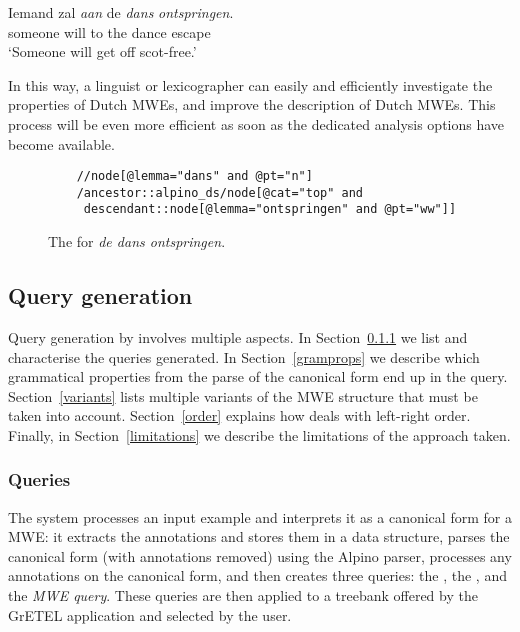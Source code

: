 \documentclass[output=paper,colorlinks,citecolor=brown]{langscibook}
\begin{document}
\begin{exe}
    \ex \gll Iemand zal \textit{aan} de \textit{dans} \textit{ontspringen}.\\
    someone will to the dance escape\\
    \glt `Someone will get off scot-free.'  \label{aandedansontspringen}
\end{exe}

In this way, a linguist or lexicographer can easily and efficiently investigate the properties of Dutch MWEs, and improve the description of Dutch MWEs. This process will be even more efficient as soon as the dedicated analysis options have become available.


\begin{figure}
\begin{verbatim}
    //node[@lemma="dans" and @pt="n"]
    /ancestor::alpino_ds/node[@cat="top" and 
     descendant::node[@lemma="ontspringen" and @pt="ww"]]
\end{verbatim}
    \caption{The {\supersetquery}  for \textit{de dans ontspringen}.} \label{dansontspringenmajorlemmaquery}
\end{figure}

\subsection{Query generation}
\label{querygeneration}

Query generation by {\mwefinder} involves multiple aspects. In Section~\ref{queries} we list and characterise the queries generated. In Section~\ref{gramprops} we describe which grammatical properties from the parse of the canonical form end up in the query. Section~\ref{variants} lists multiple variants of the MWE structure that must be taken into account. Section~\ref{order} explains how {\mwefinder} deals with left-right order. Finally, in Section~\ref{limitations} we describe the limitations of the approach taken.

\subsubsection{Queries}
\label{queries}

The system processes an input example and interprets it as a canonical form for a MWE: it extracts the annotations and stores them in a data structure, parses the canonical form (with annotations  removed) using the Alpino parser, processes any annotations on the canonical form, and then creates three queries: the \textit{{\supersetquery}}, the \textit{\nearmissquery}, and the \textit{MWE query}.
These queries are then applied to a treebank offered by the GrETEL application and selected by the user.
\end{document}
